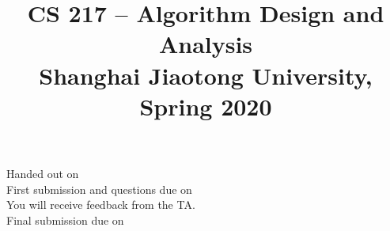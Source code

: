 


\usepackage{graphicx,amsmath,amssymb,amsthm, boxedminipage}



\usepackage{algorithm}
\usepackage{algpseudocode}
\usepackage{import}
\usepackage{color}

\newtheorem{theorem}{Theorem}%
\newtheorem{proposition}[theorem]{Proposition}
\newtheorem{lemma}[theorem]{Lemma}
\newtheorem{corollary}[theorem]{Corollary}
\newtheorem{definition}[theorem]{Definition}



\newcommand{\scalar}[2]{\ensuremath{\langle #1, #2\rangle}}
\newcommand{\floor}[1]{\left\lfloor #1 \right\rfloor}
\newcommand{\ceil}[1]{\left\lceil #1 \right\rceil}
\newcommand{\norm}[1]{\|#1\|}
\newcommand{\pfrac}[2]{\left(\frac{#1}{#2}\right)}
\newcommand{\nth}[1]{#1\textsuperscript{th}}

\newcommand{\E}{\mathop{\mathbb{E\/}}}
\newcommand{\N}{\mathbb{N}}

\newcommand{\R}{\mathbb{R}}

\newtheorem{exercise}[theorem]{Exercise}
\newtheorem{exerciseD}[theorem]{*Exercise}
\newtheorem{exerciseDD}[theorem]{**Exercise}

\let\oldexercise\exercise
\renewcommand{\exercise}{\oldexercise\normalfont}

\let\oldexerciseD\exerciseD
\renewcommand{\exerciseD}{\oldexerciseD\normalfont}

\let\oldexerciseDD\exerciseDD
\renewcommand{\exerciseDD}{\oldexerciseDD\normalfont}


\newcommand{\incfig}[2][1]{%
    \def\svgwidth{#1\columnwidth}
    {#2.pdf_tex}
}
 


\date{}

\title{CS 217 -- Algorithm Design and Analysis \\ 
  \vspace{3mm}
{\large	Shanghai Jiaotong University, Spring 2020\\
}
}
\maketitle

\noindent
Handed out on \handoutdate{}\\
First submission and questions due on \firstduedate{}\\
You will receive feedback from the TA.\\
Final submission due on \finalduedate{}
